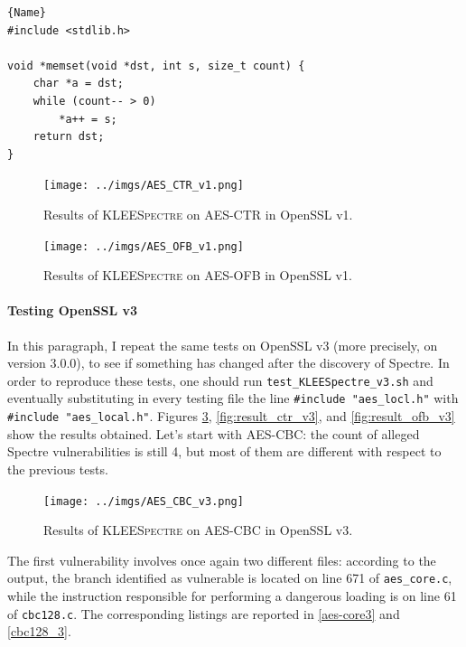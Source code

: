 \documentclass[12pt,a4paper]{book}
\theoremstyle{definition}
\begin{document}
	\begin{minipage}{.75\textwidth}
		\begin{lstlisting}[caption=\texttt{memcpy.c}, firstnumber=10, label=memset]{Name}
#include <stdlib.h>

void *memset(void *dst, int s, size_t count) {
	char *a = dst;
	while (count-- > 0)
		*a++ = s;
	return dst;
}
		\end{lstlisting}
	\end{minipage}
	\vspace{3mm}
	
	\begin{figure}[!ht]
		\centering
		\texttt{[image: ../imgs/AES\_CTR\_v1.png]}
		\captionsetup{width=.8\linewidth}
		\caption{Results of \textsc{KLEESpectre} on AES-CTR in OpenSSL v1.}
		\label{fig:result_ctr_v1} 
	\end{figure}

	\begin{figure}[!ht]
		\centering
		\texttt{[image: ../imgs/AES\_OFB\_v1.png]}
		\captionsetup{width=.8\linewidth}
		\caption{Results of \textsc{KLEESpectre} on AES-OFB in OpenSSL v1.}
		\label{fig:result_ofb_v1}
	\end{figure}

	\paragraph{Testing OpenSSL v3} In this paragraph, I repeat the same tests on OpenSSL v3 (more precisely, on version 3.0.0), to see if something has changed after the discovery of Spectre. In order to reproduce these tests, one should run \texttt{test\_KLEESpectre\_v3.sh} and eventually substituting in every testing file the line \texttt{\#include "aes\_locl.h"} with \texttt{\#include "aes\_local.h"}. Figures \ref{fig:result_cbc_v3}, \ref{fig:result_ctr_v3}, and \ref{fig:result_ofb_v3} show the results obtained. Let's start with AES-CBC: the count of alleged Spectre vulnerabilities is still 4, but most of them are different with respect to the previous tests.
	
	\begin{figure}[!ht]
		\centering
		\texttt{[image: ../imgs/AES\_CBC\_v3.png]}
		\captionsetup{width=.8\linewidth}
		\caption{Results of \textsc{KLEESpectre} on AES-CBC in OpenSSL v3.}
		\label{fig:result_cbc_v3}
	\end{figure}

	The first vulnerability involves once again two different files: according to the output, the branch identified as vulnerable is located on line 671 of \texttt{aes\_core.c}, while the instruction responsible for performing a dangerous loading is on line 61 of \texttt{cbc128.c}. The corresponding listings are reported in \ref{aes-core3} and \ref{cbc128_3}.
	
\end{document}
